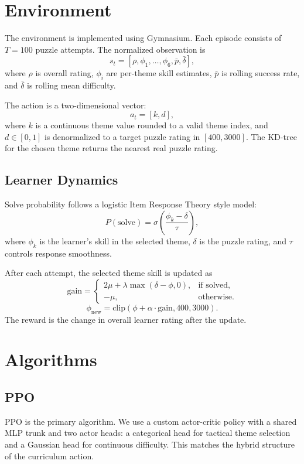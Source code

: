 \documentclass[10pt,twocolumn]{article}
\begin{document}
\section{Environment}

The environment is implemented using Gymnasium. Each episode consists of $T=100$
puzzle attempts. The normalized observation is
\[
s_t=[\rho,\phi_1,\ldots,\phi_6,\bar{p},\bar{\delta}],
\]
where $\rho$ is overall rating, $\phi_i$ are per-theme skill estimates, $\bar{p}$ is
rolling success rate, and $\bar{\delta}$ is rolling mean difficulty.

The action is a two-dimensional vector:
\[
a_t=[k,d],
\]
where $k$ is a continuous theme value rounded to a valid theme index, and $d\in[0,1]$
is denormalized to a target puzzle rating in $[400,3000]$. The KD-tree for the chosen
theme returns the nearest real puzzle rating.

\subsection{Learner Dynamics}

Solve probability follows a logistic Item Response Theory style model:
\[
P(\text{solve}) =
\sigma\left(\frac{\phi_k-\delta}{\tau}\right),
\]
where $\phi_k$ is the learner's skill in the selected theme, $\delta$ is the puzzle
rating, and $\tau$ controls response smoothness.

After each attempt, the selected theme skill is updated as
\[
\text{gain}=
\begin{cases}
2\mu + \lambda\max(\delta-\phi,0), & \text{if solved},\\
-\mu, & \text{otherwise}.
\end{cases}
\]
\[
\phi_{\text{new}}=\text{clip}(\phi+\alpha\cdot\text{gain},400,3000).
\]
The reward is the change in overall learner rating after the update.

\section{Algorithms}

\subsection{PPO}

PPO is the primary algorithm. We use a custom actor-critic policy with a shared MLP
trunk and two actor heads: a categorical head for tactical theme selection and a
Gaussian head for continuous difficulty. This matches the hybrid structure of the
curriculum action.
\end{document}
